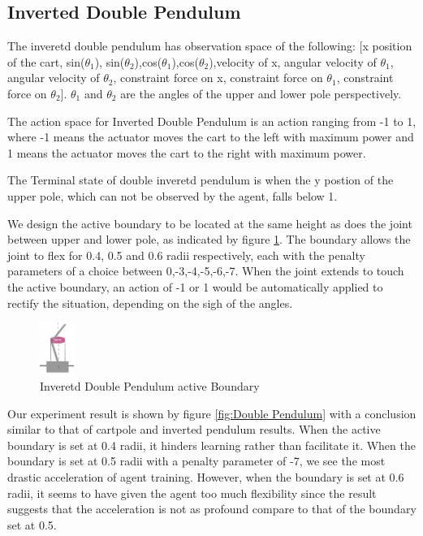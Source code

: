 \documentclass[journal]{IEEEtran}
\begin{document}
\subsection{Inverted Double Pendulum}
The inveretd double pendulum has observation space of the following: [x position of the cart, sin($\theta_1$), sin($\theta_2$),cos($\theta_1$),cos($\theta_2$),velocity of x, angular velocity of $\theta_1$, angular velocity of $\theta_2$, constraint force on x, constraint force on $\theta_1$, constraint force on $\theta_2$]. $\theta_1$ and $\theta_2$ are the angles of the upper and lower pole perspectively.

The action space for Inverted Double Pendulum is an action ranging from -1 to 1, where -1 means the actuator moves the cart to the left with maximum power and 1 means the actuator moves the cart to the right with maximum power.

The Terminal state of double inveretd pendulum is when the y postion of the upper pole, which can not be observed by the agent, falls below 1.

We design the active boundary to be located at the same height as does the joint between upper and lower pole, as indicated by figure \ref{fig:doublePB}. The boundary allows the joint to flex for 0.4, 0.5 and 0.6 radii respectively, each with the penalty parameters of a choice between 0,-3,-4,-5,-6,-7. When the joint extends to touch the active boundary, an action of -1 or 1 would be automatically applied to rectify the situation, depending on the sigh of the angles.

\begin{figure}
     \centering
      \includegraphics[width=0.1\textwidth]{cartpole2.png}
      \caption{Inveretd Double Pendulum active Boundary}
      \label{fig:doublePB}
\end{figure}

Our experiment result is shown by figure \ref{fig:Double Pendulum} with a conclusion similar to that of cartpole and inverted pendulum results. When the active boundary is set at 0.4 radii, it hinders learning rather than facilitate it. When the boundary is set at 0.5 radii with a penalty parameter of -7, we see the most drastic acceleration of agent training. However, when the boundary is set at 0.6 radii, it seems to have given the agent too much flexibility since the result suggests that the acceleration is not as profound compare to that of the boundary set at 0.5.
\end{document}
